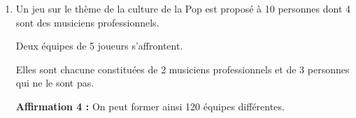 \documentclass[10pt]{article}
\providecommand{\np}[2][]{{#2~#1}}
\begin{document}
\begin{enumerate}[itemsep=5mm]
		On considère la variable aléatoire $X$ qui, à tout échantillon ainsi défini, associe le nombre de musiciens professionnels dans l'échantillon.

		\medskip

		\textbf{Affirmation 2 :} En arrondissant le résultat au dixième, on a \quad $P(X \leqslant  340) \approx 0,4$.

		\medskip

		\textbf{Affirmation 3 :} En appliquant l'inégalité de Bienaymé-Tchebychev, on peut affirmer qu'il y a plus de $95\,\%$ de chance que, sur cet échantillon de \np{5000} actifs dans le secteur de la culture, le nombre de musiciens professionnels soit strictement compris entre 230 et 390.

		\item Un jeu sur le thème de la culture de la Pop est proposé à 10 personnes dont 4 sont des musiciens professionnels.

		Deux équipes de 5 joueurs s'affrontent.

		Elles sont chacune constituées de 2 musiciens professionnels et de 3 personnes qui ne le sont pas.

		\textbf{Affirmation 4 :} On peut former ainsi 120 équipes différentes.
	\end{enumerate}
\end{document}
